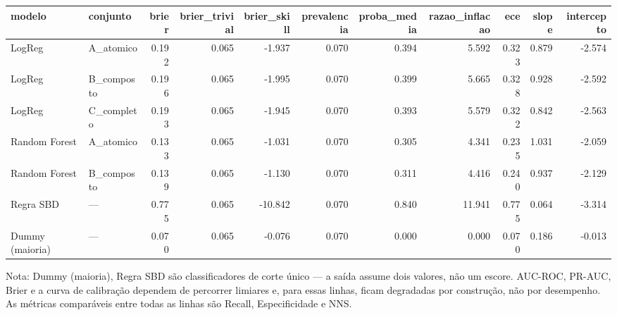 \begin{tabular}{llrrrrrrrrr}
\toprule
modelo & conjunto & brier & brier_trivial & brier_skill & prevalencia & proba_media & razao_inflacao & ece & slope & intercepto \\
\midrule
LogReg & A_atomico & 0.192 & 0.065 & -1.937 & 0.070 & 0.394 & 5.592 & 0.323 & 0.879 & -2.574 \\
LogReg & B_composto & 0.196 & 0.065 & -1.995 & 0.070 & 0.399 & 5.665 & 0.328 & 0.928 & -2.592 \\
LogReg & C_completo & 0.193 & 0.065 & -1.945 & 0.070 & 0.393 & 5.579 & 0.322 & 0.842 & -2.563 \\
Random Forest & A_atomico & 0.133 & 0.065 & -1.031 & 0.070 & 0.305 & 4.341 & 0.235 & 1.031 & -2.059 \\
Random Forest & B_composto & 0.139 & 0.065 & -1.130 & 0.070 & 0.311 & 4.416 & 0.240 & 0.937 & -2.129 \\
Regra SBD & — & 0.775 & 0.065 & -10.842 & 0.070 & 0.840 & 11.941 & 0.775 & 0.064 & -3.314 \\
Dummy (maioria) & — & 0.070 & 0.065 & -0.076 & 0.070 & 0.000 & 0.000 & 0.070 & 0.186 & -0.013 \\
\bottomrule
\end{tabular}

\begin{flushleft}
\footnotesize Nota: Dummy (maioria), Regra SBD são classificadores de corte único — a saída assume dois valores, não um escore. AUC-ROC, PR-AUC, Brier e a curva de calibração dependem de percorrer limiares e, para essas linhas, ficam degradadas por construção, não por desempenho. As métricas comparáveis entre todas as linhas são Recall, Especificidade e NNS.
\end{flushleft}

